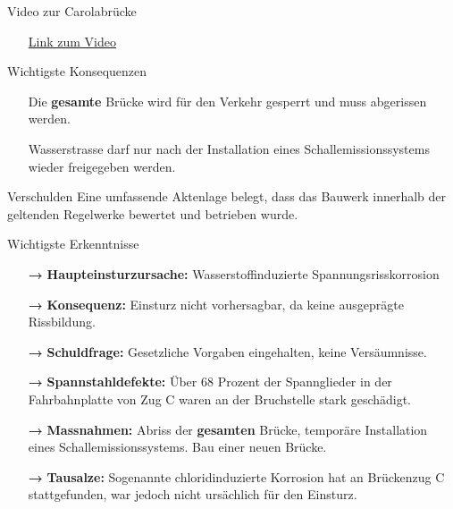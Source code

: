 \begin{frame}{Video zur Carolabrücke}
    \begin{block}{}
        \begin{itemize}
            \item[\textbullet] \href{https://www.youtube.com/watch?v=5J9Z1K1Z9f4}{Link zum Video}
        \end{itemize}
    \end{block}

\end{frame}

\begin{frame}{Wichtigste Konsequenzen}
    \begin{block}{}
        \begin{itemize}
            \item[\textbullet] Die \textbf{gesamte }Brücke wird für den Verkehr gesperrt und muss abgerissen werden.
            \item[\textbullet] Wasserstrasse darf nur nach der Installation eines Schallemissionssystems wieder freigegeben werden.
        \end{itemize}
    \end{block}
    \pause
    \begin{block}{Verschulden}
        Eine umfassende Aktenlage belegt, dass
        das Bauwerk innerhalb der geltenden Regelwerke bewertet und betrieben wurde.
    \end{block}
\end{frame}

\begin{frame}{Wichtigste Erkenntnisse}
    \begin{itemize}
        \item [\textbf{→}] \textbf{Haupteinsturzursache:} Wasserstoffinduzierte Spannungsrisskorrosion
        \item [\textbf{→}] \textbf{Konsequenz:} Einsturz nicht vorhersagbar, da keine ausgeprägte Rissbildung.
        \item [\textbf{→}] \textbf{Schuldfrage:} Gesetzliche Vorgaben eingehalten, keine Versäumnisse.
        \item [\textbf{→}] \textbf{Spannstahldefekte:} Über 68 Prozent der Spannglieder in der Fahrbahnplatte von Zug C waren an der Bruchstelle stark geschädigt. 
        \item [\textbf{→}] \textbf{Massnahmen:} Abriss der \textbf{gesamten} Brücke, temporäre Installation eines Schallemissionssystems. Bau einer neuen Brücke.
        \item [\textbf{→}] \textbf{Tausalze:} Sogenannte chloridinduzierte Korrosion hat an Brückenzug C stattgefunden, war jedoch nicht ursächlich für den Einsturz. 
    \end{itemize}


\end{frame}



